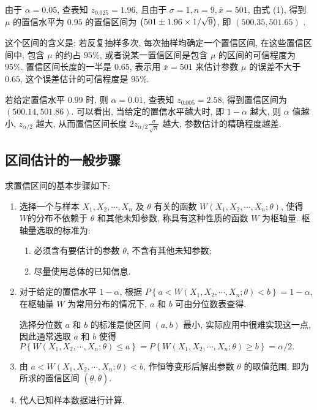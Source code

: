 由于 $ \alpha=0.05$, 查表知 $ z_{0.025}=1.96$, 
且由于 $ \sigma=1, n=9, \bar{x}=501 $, 由式 (1), 
得到 $ \mu $ 的置信水平为 $0.95$ 的置信区间为 $\qty(501 \pm 1.96 \times 1 / \sqrt{9}) $, 即  $(500.35,501.65)$ .

这个区间的含义是: 若反复抽样多次, 每次抽样均确定一个置信区间, 在这些置信区间中, 包含 $ \mu $ 的约占 $ 95 \% $, 
或者说某一置信区间是包含 $ \mu $ 的区间的可信程度为 $ 95 \% $.
置信区间长度的一半是 $0.65$, 表示用 $ \bar{x}=501 $ 来估计参数 $ \mu $ 的误差不大于 $0.65$, 这个误差估计的可信程度是 $ 95 \% .$

若给定置信水平 $0.99$ 时, 则 $ \alpha=0.01$, 查表知 $ z_{0.005}=2.58$, 
得到置信区间为 $ (500.14 , 501. 86)$. 可以看出, 当给定的置信水平越大时, 即 $ 1-\alpha $ 越大, 
则 $ \alpha $ 值越小, $z_{\alpha / 2} $ 越大, 从而置信区间长度 $\displaystyle 2 z_{\alpha / 2} \frac{\sigma}{\sqrt{n}} $ 越大, 
参数估计的精确程度越差.

\subsection{区间估计的一般步骤}

求置信区间的基本步骤如下:
\begin{enumerate}[label=(\arabic{*})]
    \item 选择一个与样本 $ X_{1}, X_{2}, \cdots, X_{n} $ 及 $ \theta $ 有关的函数 $ W\left(X_{1}, X_{2}, \cdots, X_{n} ; \theta\right) $, 
          使得 $ W $的分布不依赖于 $ \theta $ 和其他未知参数, 称具有这种性质的函数 $ W $ 为枢轴量.
          枢轴量选取的标准为:
          \begin{enumerate}
              \item 必须含有要估计的参数 $ \theta $, 不含有其他未知参数;
              \item 尽量使用总体的已知信息.
          \end{enumerate}
    \item 对于给定的置信水平 $ 1-\alpha$, 根据 $\displaystyle P\left\{a<W\left(X_{1}, X_{2}, \cdots, X_{n} ; \theta\right)<b\right\}=1-\alpha $, 
          在枢轴量 $ W $ 为常用分布的情况下, $a$ 和 $ b $ 可由分位数表查得.

          选择分位数 $ a $ 和 $ b $ 的标准是使区间 $ (a, b) $ 最小, 实际应用中很难实现这一点, 因此通常选取 $ a $ 和 $ b $ 使得
          $\displaystyle P\left\{W\left(X_{1}, X_{2}, \cdots, X_{n} ; \theta\right) \leqslant a\right\}=P\left\{W\left(X_{1}, X_{2}, \cdots, X_{n} ; \theta\right) \geqslant b\right\}=\alpha / 2 .$
    \item 由 $ a<W\left(X_{1}, X_{2}, \cdots, X_{n} ; \theta\right)<b$, 作恒等变形后解出参数 $ \theta $ 的取值范围, 即为所求的置信区间 $ (\underline{\theta}, \bar{\theta}) $.
    \item 代人已知样本数据进行计算.
\end{enumerate}
